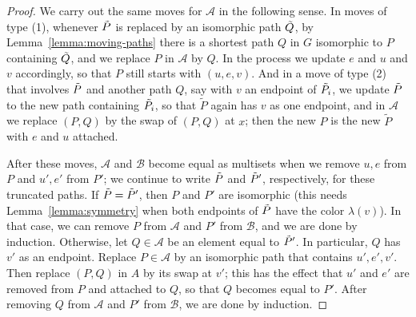 \documentclass[10pt,a4paper]{amsart}
\newcommand{\cA}{\mathcal{A}}
\newcommand{\cB}{\mathcal{B}}
\begin{document}
\begin{proof}
We carry out the same moves for $\cA$ in the following sense. In moves
of type (1), whenever $\Tilde{P}$ is replaced by an isomorphic path
$\Tilde{Q}$, by Lemma~\ref{lemma:moving-paths} there is a shortest path
$Q$ in $G$ isomorphic to $P$ containing $\Tilde{Q}$, and we replace $P$
in $\cA$ by $Q$. In the process we update $e$ and $u$ and $v$
accordingly, so that $P$ still starts with $(u,e,v)$. And in a move of type (2)
that involves $\Tilde{P}$ and another path $Q$, say with $v$ an endpoint of $\Tilde{P}_i$, we update $\Tilde{P}$ to the new path containing $\Tilde{P}_i$,
so that $\tilde{P}$ again has $v$ as one endpoint, and in $\cA$ we 
replace $(P,Q)$ by the swap of $(P,Q)$ at $x$; then the new $P$ is the
new $\tilde{P}$ with $e$ and $u$ attached. 

After these moves, $\cA$ and $\cB$ become equal as multisets when
we remove $u,e$ from $P$ and $u',e'$ from $P'$; we continue to write
$\Tilde{P}$ and $\Tilde{P}'$, respectively, for these truncated paths.
If $\Tilde{P}=\Tilde{P}'$, then $P$ and $P'$ are isomorphic (this needs
Lemma~\ref{lemma:symmetry} when both endpoints of $\Tilde{P}$ have the
color $\lambda(v)$). In that case, we can remove $P$ from $\cA$ and $P'$
from $\cB$, and we are done by induction.  Otherwise, let $Q \in \cA$
be an element equal to $\Tilde{P}'$. In particular, $Q$ has $v'$ as an
endpoint.  Replace $P \in \cA$ by an isomorphic path that contains
$u',e',v'$. Then replace $(P,Q)$ in $A$ by its swap at $v'$; this has
the effect that $u'$ and $e'$ are removed from $P$ and attached to $Q$,
so that $Q$ becomes equal to $P'$. After removing $Q$ from $\cA$ and $P'$
from $\cB$, we are done by induction.
\end{proof}
\end{document}
